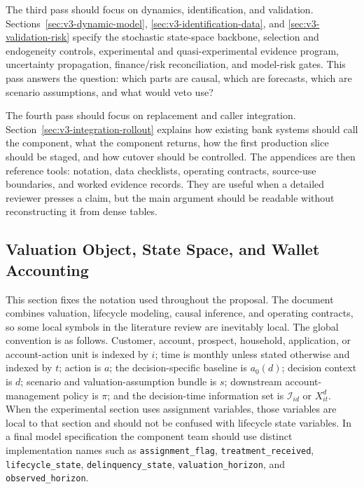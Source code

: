 \documentclass[11pt]{article}
\newcommand{\1}{\mathbf{1}}
\newcommand{\code}[1]{\nolinkurl{#1}}
\begin{document}
The third pass should focus on dynamics, identification, and validation.
Sections~\ref{sec:v3-dynamic-model}, \ref{sec:v3-identification-data}, and
\ref{sec:v3-validation-risk} specify the stochastic state-space backbone,
selection and endogeneity controls, experimental and quasi-experimental
evidence program, uncertainty propagation, finance/risk reconciliation, and
model-risk gates. This pass answers the question: which parts are causal,
which are forecasts, which are scenario assumptions, and what would veto use?

The fourth pass should focus on replacement and caller integration.
Section~\ref{sec:v3-integration-rollout} explains how existing bank systems
should call the component, what the component returns, how the first production
slice should be staged, and how cutover should be controlled. The appendices
are then reference tools: notation, data checklists, operating contracts,
source-use boundaries, and worked evidence records. They are useful when a
detailed reviewer presses a claim, but the main argument should be readable
without reconstructing it from dense tables.

\subsection{Valuation Object, State Space, and Wallet Accounting}
\label{sec:valuation-spine}

This section fixes the notation used throughout the proposal. The document
combines valuation, lifecycle modeling, causal inference, and operating
contracts, so some local symbols in the literature review are inevitably
local. The global convention is as follows. Customer, account, prospect,
household, application, or account-action unit is indexed by $i$; time is
monthly unless stated otherwise and indexed by $t$; action is $a$; the
decision-specific baseline is $a_0(d)$; decision context is $d$; scenario and
valuation-assumption bundle is $s$; downstream account-management policy is
$\pi$; and the decision-time information set is $\mathcal{I}_{id}$ or
$X_{it}^{d}$. When the experimental section uses assignment variables, those
variables are local to that section and should not be confused with lifecycle
state variables. In a final model specification the component team should use
distinct implementation names such as \code{assignment_flag},
\code{treatment_received}, \code{lifecycle_state}, \code{delinquency_state},
\code{valuation_horizon}, and \code{observed_horizon}.
\end{document}

